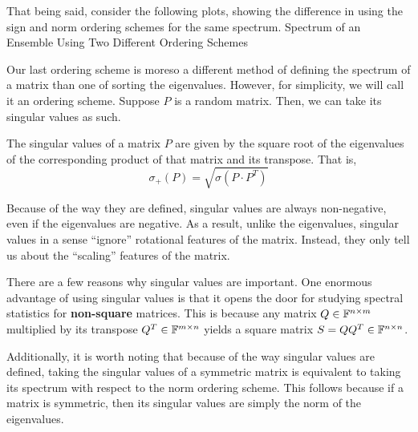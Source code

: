 That being said, consider the following plots, showing the difference in using the sign and norm ordering schemes for the same spectrum.
\trim
{Spectrum of an Ensemble Using Two Different Ordering Schemes}

\newpage
{}

Our last ordering scheme is moreso a different method of defining the spectrum of a matrix than one of sorting the eigenvalues.
However, for simplicity, we will call it an ordering scheme.
Suppose $P$ is a random matrix.
Then, we can take its singular values as such.
\begin{definition}
The singular values of a matrix $P$ are given by the square root of the eigenvalues of the corresponding product of that matrix and its transpose.
That is, $$\sigma_+(P) = \sqrt{\sigma(P \cdot P^T)}$$
\end{definition}
Because of the way they are defined, singular values are always non-negative, even if the eigenvalues are negative.
As a result, unlike the eigenvalues, singular values in a sense ``ignore'' rotational features of the matrix. Instead, they only tell us about the ``scaling'' features of the matrix.

There are a few reasons why singular values are important.
One enormous advantage of using singular values is that it opens the door for studying spectral statistics for \textbf{non-square} matrices.
This is because any matrix $Q \in \mathbb{F}^{n \times m}$ multiplied by its transpose $Q^T \in \mathbb{F}^{m \times n}$ yields a square matrix $S = Q Q^T \in \mathbb{F}^{n \times n}$.

Additionally, it is worth noting that because of the way singular values are defined,
taking the singular values of a symmetric matrix is equivalent to taking its spectrum with respect to the norm ordering scheme.
This follows because if a matrix is symmetric, then its singular values are simply the norm of the eigenvalues.

\spectrumschemetable


